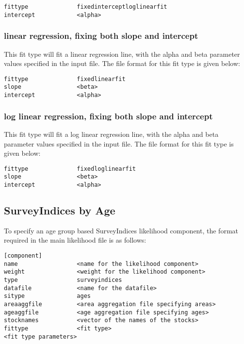 \documentclass[10pt,twoside]{book}
\begin{document}
{\small\begin{verbatim}
fittype              fixedinterceptloglinearfit
intercept            <alpha>
\end{verbatim}}

\subsubsection{linear regression, fixing both slope and intercept}
This fit type will fit a linear regression line, with the alpha and beta parameter values specified in the input file.  The file format for this fit type is given below:

{\small\begin{verbatim}
fittype              fixedlinearfit
slope                <beta>
intercept            <alpha>
\end{verbatim}}

\subsubsection{log linear regression, fixing both slope and intercept}
This fit type will fit a log linear regression line, with the alpha and beta parameter values specified in the input file.  The file format for this fit type is given below:

{\small\begin{verbatim}
fittype              fixedloglinearfit
slope                <beta>
intercept            <alpha>
\end{verbatim}}

\subsection{SurveyIndices by Age}\label{subsec:sibyage}
To specify an age group based SurveyIndices likelihood component, the format required in the main likelihood file is as follows:

{\small\begin{verbatim}
[component]
name                 <name for the likelihood component>
weight               <weight for the likelihood component>
type                 surveyindices
datafile             <name for the datafile>
sitype               ages
areaaggfile          <area aggregation file specifying areas>
ageaggfile           <age aggregation file specifying ages>
stocknames           <vector of the names of the stocks>
fittype              <fit type>
<fit type parameters>
\end{verbatim}}
\end{document}
